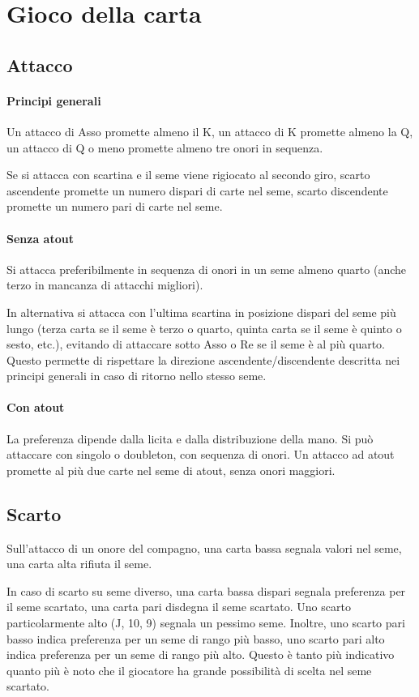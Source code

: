 \documentclass[a4paper,10pt]{article}
\begin{document}
\pagebreak

\section{Gioco della carta}

\subsection{Attacco}

\paragraph{Principi generali} Un attacco di Asso promette almeno il K, un attacco di K promette almeno la Q, un attacco di Q o meno promette almeno tre onori in sequenza.

Se si attacca con scartina e il seme viene rigiocato al secondo giro, scarto ascendente promette un numero dispari di carte nel seme, scarto discendente promette un numero pari di carte nel seme.


\paragraph{Senza atout} Si attacca preferibilmente in sequenza di onori in un seme almeno quarto (anche terzo in mancanza di attacchi migliori).

In alternativa si attacca con l'ultima scartina in posizione dispari del seme più lungo (terza carta se il seme è terzo o quarto, quinta carta se il seme è quinto o sesto, etc.), evitando di attaccare sotto Asso o Re se il seme è al più quarto. Questo permette di rispettare la direzione ascendente/discendente descritta nei principi generali in caso di ritorno nello stesso seme.

\paragraph{Con atout} La preferenza dipende dalla licita e dalla distribuzione della mano. Si può attaccare con singolo o doubleton, con sequenza di onori. Un attacco ad atout promette al più due carte nel seme di atout, senza onori maggiori.

\subsection{Scarto}

Sull'attacco di un onore del compagno, una carta bassa segnala valori nel seme, una carta alta rifiuta il seme.

In caso di scarto su seme diverso, una carta bassa dispari segnala preferenza per il seme scartato, una carta pari disdegna il seme scartato. Uno scarto particolarmente alto (J, 10, 9) segnala un pessimo seme. Inoltre, uno scarto pari basso indica preferenza per un seme di rango più basso, uno scarto pari alto indica preferenza per un seme di rango più alto. Questo è tanto più indicativo quanto più è noto che il giocatore ha grande possibilità di scelta nel seme scartato.
\end{document}
